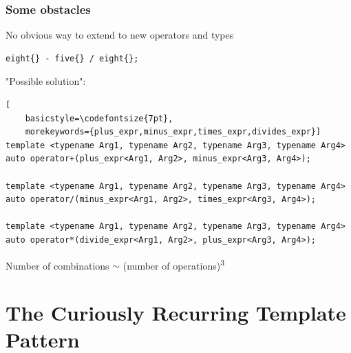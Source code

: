 \documentclass[14pt]{beamer}
\begin{document}
\begin{frame}[fragile]
  \frametitle{Some obstacles}

  No obvious way to extend to new operators and types

  \begin{lstlisting}[basicstyle=\codefontsize{14pt}]
eight{} - five{} / eight{};
  \end{lstlisting}

  \vspace{.2cm}

  "Possible solution":
  \begin{lstlisting}[
    basicstyle=\codefontsize{7pt},
    morekeywords={plus_expr,minus_expr,times_expr,divides_expr}]
template <typename Arg1, typename Arg2, typename Arg3, typename Arg4>
auto operator+(plus_expr<Arg1, Arg2>, minus_expr<Arg3, Arg4>);

template <typename Arg1, typename Arg2, typename Arg3, typename Arg4>
auto operator/(minus_expr<Arg1, Arg2>, times_expr<Arg3, Arg4>);

template <typename Arg1, typename Arg2, typename Arg3, typename Arg4>
auto operator*(divide_expr<Arg1, Arg2>, plus_expr<Arg3, Arg4>);
  \end{lstlisting}

  \vspace{.2cm}

  Number of combinations $\sim$ (number of operations)\textsuperscript{3}

\end{frame}

\section{The Curiously Recurring Template Pattern}
\frame{\sectionpage}
\end{document}

